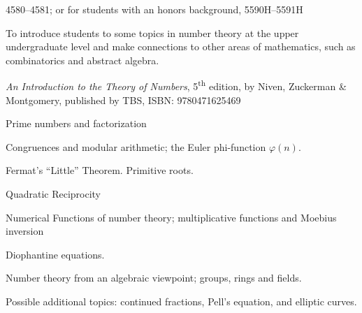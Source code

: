 \documentclass{osucourse}
\begin{document}
\CatalogDescription
\PrerequisitesAndExclusions

\begin{FollowupCourses}
4580--4581; or for students with an honors background, 5590H--5591H
\end{FollowupCourses}

\begin{Purpose}
To introduce students to some topics in number theory at the upper
undergraduate level and make connections to other areas of mathematics,
such as combinatorics and abstract algebra.
\end{Purpose}

\begin{Text}
\emph{An Introduction to the Theory of Numbers}, 5\textsuperscript{th}
edition, by Niven, Zuckerman \& Montgomery, published by TBS, ISBN:
9780471625469
\end{Text}

\begin{TopicsList}
\item
  Prime numbers and factorization
\item
  Congruences and modular arithmetic; the Euler phi-function
  \(\varphi(n)\).
\item
  Fermat's ``Little'' Theorem. Primitive roots.
\item
  Quadratic Reciprocity
\item
  Numerical Functions of number theory; multiplicative functions and
  Moebius inversion
\item
  Diophantine equations.
\item
  Number theory from an algebraic viewpoint; groups, rings and fields.
\item
  Possible additional topics: continued fractions, Pell's equation, and
  elliptic curves.
\end{TopicsList}

\begin{SuggestedSchedule}
\end{SuggestedSchedule}
\end{document}
